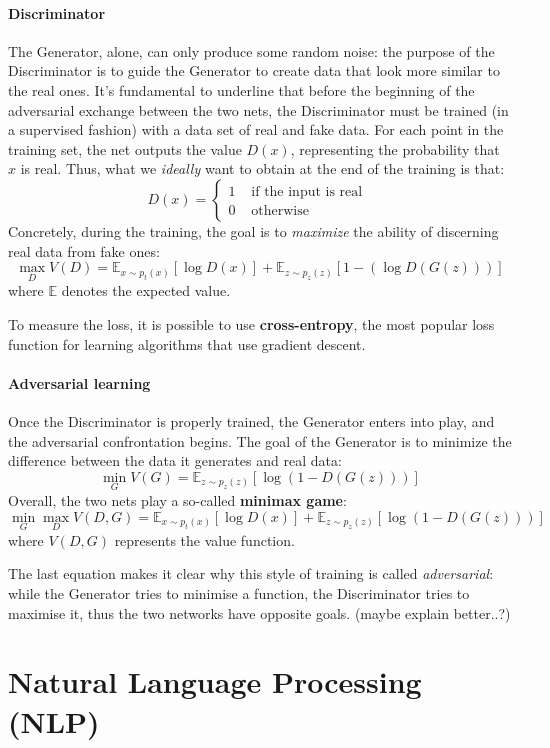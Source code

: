 \documentclass[12pt,a4paper]{book}
\theoremstyle{definition}
\begin{document}
	\paragraph{Discriminator}
	The Generator, alone, can only produce some random noise: the purpose of the Discriminator is to guide the Generator to create data that look more similar to the real ones. It's fundamental to underline that before the beginning of the adversarial exchange between the two nets, the Discriminator must be trained (in a supervised fashion) with a data set of real and fake data.
	For each point in the training set, the net outputs the value $D(x)$, representing the probability that $x$ is real. Thus, what we \textit{ideally} want to obtain at the end of the training is that:
	\[
	D(x) = \begin{cases}
		1 &\text{ if the input is real }\\
		0 & \text{ otherwise }
	\end{cases}
	\]
	Concretely, during the training, the goal is to \textit{maximize} the ability of discerning real data from fake ones:
	\[
	\max_D V(D) = \mathbb{E}_{x\sim p_t(x)}[\log D(x)] + \mathbb{E}_{z\sim p_z(z)}[1-(\log D(G(z)))]
	\]
	where $\mathbb{E}$ denotes the expected value.
	
	To measure the loss, it is possible to use \textbf{cross-entropy}, the most popular loss function for learning algorithms that use gradient descent.
	\paragraph{Adversarial learning}
	Once the Discriminator is properly trained, the Generator enters into play, and the adversarial confrontation begins. The goal of the Generator is to minimize the difference between the data it generates and real data:
	\[
	\min_G V(G) = \mathbb{E}_{z\sim p_z(z)}[\log(1-D(G(z)))]
	\]
	Overall, the two nets play a so-called \textbf{minimax game}:
	\[
	\min_G \max_D V(D,G) = \mathbb{E}_{x\sim p_t(x)}[\log D(x)] + \mathbb{E}_{z\sim p_z(z)}[\log (1-D(G(z)))]
	\]
	where $V(D,G)$ represents the value function.
	
	The last equation makes it clear why this style of training is called \textit{adversarial}: while the Generator tries to minimise a function, the Discriminator tries to maximise it, thus the two networks have opposite goals. (maybe explain better..?)
	
	\section{Natural Language Processing (NLP)}
	
	{}
	
	
\end{document}
